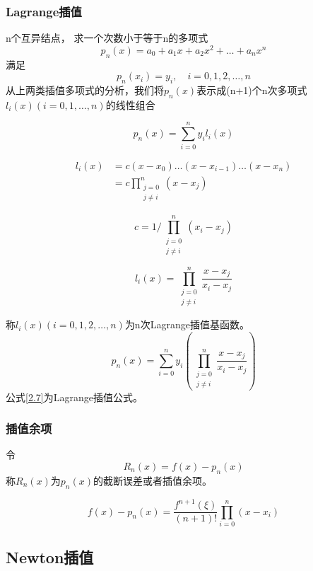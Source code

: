 \documentclass[12pt]{report}
\numberwithin{equation}{section}
\begin{document}
	\subsubsection{Lagrange插值}
	n个互异结点， 求一个次数小于等于n的多项式
	$$
	p_n (x) = a_0 + a_1 x + a_2 x^2 + \ldots + a_n x^n
	$$
	满足
	$$
	p_n (x_i) = y_i , \quad i=0, 1, 2, \ldots , n
	$$
	从上两类插值多项式的分析，我们将$p_n (x)$表示成(n+1)个n次多项式$l_i (x) (i=0,1,\ldots ,n)$的线性组合
	
	$$
	p_n (x) = \sum_{i=0}^n y_i l_i (x)
	$$

	$$
	\begin{aligned}
		l_i (x) & = c\left(x - x_0 \right)\ldots \left(x - x_{i-1} \right) \ldots \left(x - x_n \right)  \\
		& = c \prod_{\substack{j=0 \\ j \neq i}}^{n} (x - x_j)
	\end{aligned}
	$$

	$$
	c=1 / \prod_{\substack{j=0 \\ j \neq i}}^{n}\left(x_{i}-x_{j}\right)
	$$

	$$
	l_{i}(x)=\prod_{\substack{j=0 \\ j \neq i}}^{n} \frac{x-x_{j}}{x_{i}-x_{j}}
	$$

	称$l_i (x) (i=0, 1, 2, \ldots , n)$为n次Lagrange插值基函数。
	\begin{equation} \tag{2.7} \label{2.7}
		p_n (x) = \sum_{i=0}^n y_i(\prod_{\substack{j=0 \\ j \neq i}}^{n} \frac{x-x_{j}}{x_{i}-x_{j}})
	\end{equation}
	公式\eqref{2.7}为Lagrange插值公式。

	\subsubsection{插值余项}
	令
	$$
	R_n(x) = f(x) - p_n(x)
	$$
	称$R_n(x)$为$p_n(x)$的截断误差或者插值余项。

	\begin{equation} \tag{2.8} \label{2.8}
		f(x) - p_n(x) = \frac{f^{n+1}(\xi)}{(n+1)!} \prod_{i=0}^n(x - x_i)
	\end{equation}

	\subsection{Newton插值}
\end{document}
